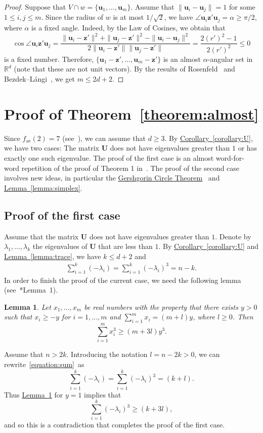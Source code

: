 \documentclass[a4paper, oneside, reqno, 12pt]{amsart}
\theoremstyle{plain}
\newtheorem{lemma}[theorem]{Lemma}
\theoremstyle{definition}
\begin{document}
\begin{proof}
Suppose that  $V\cap w=\{\mathbf u_1, \dots, \mathbf u_m\}$. Assume that $\|\mathbf u_i-\mathbf u_j\|=1$ for some $1\leq i,j \leq m$. Since the radius of $w$ is at most $1/\sqrt{2}$, we have $\angle \mathbf u_i\mathbf z'\mathbf u_j=\alpha\geq \pi/2$, where $\alpha$ is a fixed angle. Indeed, by the Law of Cosines, we obtain that
\[
\cos \angle \mathbf u_i\mathbf z'\mathbf u_j=\frac{\|\mathbf u_i-\mathbf z'\|^2+\|\mathbf u_j-\mathbf z'\|^2-\|\mathbf u_i-\mathbf u_j\|^2}{2\|\mathbf u_i-\mathbf z'\|\|\mathbf u_j-\mathbf z'\|}=\frac{2(r')^2-1}{2(r')^2}\leq 0
\]
is a fixed number. Therefore, $\{\mathbf u_1-\mathbf z',\dots,\mathbf u_m-\mathbf z'\}$ is an almost $\alpha$-angular set in $\mathbb R^d$ (note that these are not unit vectors). By the results of Rosenfeld~\cite{R90} and Bezdek--L\'angi~\cite{BL00}, we get $m\leq 2d+2$.
\end{proof}

\section{Proof of Theorem~\ref{theorem:almost}}
\label{section:proof}
Since $f_{\mathrm{ae}}(2)=7$ (see~\cite{BNV03}), we can assume that $d\geq 3$. By \hyperref[corollary:U]{Corollary~\ref{corollary:U}}, we have two cases: The matrix $\mathbf U$ does not have eigenvalues greater than $1$ or has exactly one such eigenvalue. The proof of the first case is an almost word-for-word
repetition of the proof of Theorem 1 in~\cite{BL00}. The proof of the second case involves new ideas, in particular the \hyperref[theorem:gershgorin]{Gershgorin Circle Theorem}~\cite{G31} and \hyperref[lemma:simplex]{Lemma~\ref*{lemma:simplex}}.
\subsection{Proof of the first case}\label{subsection:case1} Assume that the matrix $\mathbf U$ does not have eigenvalues greater than $1$. Denote by $\lambda_1, \dots, \lambda_k$ the eigenvalues of $\mathbf U$ that are less than $1$. By \hyperref[corollary:U]{Corollary~\ref*{corollary:U}} and \hyperref[lemma:trace]{Lemma~\ref{lemma:trace}}, we have $k\leq d+2$ and
\begin{gather}
\label{equation:sum}
\sum_{i=1}^k(-\lambda_i)=\sum_{i=1}^k (-\lambda_i)^3=n-k.
\end{gather}
In order to finish the proof of the current case, we need the following lemma (see~\cite{BL00}*{Lemma~1}).
\begin{lemma}
	\label{lemma:bezdeklangi}
	Let $x_1,\dots, x_m$ be real numbers with the property that there exists $y>0$ such that $x_i\geq -y$ for $i=1,\dots,m$ and $\sum_{i=1}^mx_i=(m+l)y$, where $l\geq 0$. Then
	\[
	\sum_{i=1}^m x_i^3\geq (m+3l)y^3.
	\] 	
\end{lemma}
Assume that $n>2k$. Introducing the notation $l=n-2k>0$, we can rewrite~\eqref{equation:sum}~as
\[
	\sum_{i=1}^k(-\lambda_i)=\sum_{i=1}^k(-\lambda_i)^3=(k+l).
\]
Thus \hyperref[lemma:bezdeklangi]{Lemma~\ref*{lemma:bezdeklangi}} for $y=1$ implies that
\[
	\sum_{i=1}^k(-\lambda_i)^3\geq(k+3l),
\]
and so this is a contradiction that completes the proof of the first case.
\end{document}
